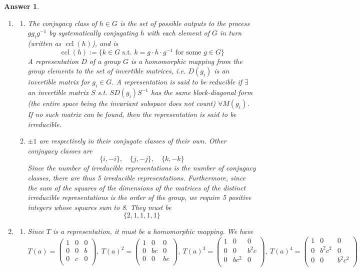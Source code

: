 \documentclass[a4paper]{article}
\DeclareMathOperator{\ccl}{ccl}
\newtheorem{ans}{Answer}[section]
\theoremstyle{new}
\begin{document}
\begin{ans}\leavevmode
\begin{enumerate}[label=(\roman*)]
\item
\begin{enumerate}[label=(\alph*)]
\item The conjugacy class of $h\in G$ is the set of possible outputs to the process $gg_ig^{-1}$ by systematically conjugating $h$ with each element of $G$ in turn (written as $\ccl(h)$), and is
$$\ccl(h):=\{k\in G\text{ s.t. }k=g\cdot h\cdot g^{-1}\text{ for some }g\in G\}$$
A representation $D$ of a group $G$ is a homomorphic mapping from the group elements to the set of invertible matrices, i.e. $D(g_i)$ is an invertible matrix for $g_i\in G$. A representation is said to be reducible if $\exists$ an invertible matrix $S$ s.t. $SD(g_i)S^{-1}$ has the same block-diagonal form (the entire space being the invariant subspace does not count) $\forall M(g_i)$. If no such matrix can be found, then the representation is said to be irreducible.
\item $\pm1$ are respectively in their conjugate classes of their own. Other conjugacy classes are
$$\{i,-i\},\quad\{j,-j\},\quad\{k,-k\}$$
Since the number of irreducible representations is the number of conjugacy classes, there are thus 5 irreducible representations. Furthermore, since the sum of the squares of the dimensions of the matrices of the distinct irreducible representations is the order of the group, we require 5 positive integers whose squares sum to 8. They must be
$$\{2,1,1,1,1\}$$
\end{enumerate}
\item 
\begin{enumerate}[label=(\alph*)]
\item Since $T$ is a representation, it must be a homomorphic mapping. We have
$$T(a)=\begin{pmatrix}1&0&0\\0&0&b\\0&c&0\\\end{pmatrix},~ T(a)^2=\begin{pmatrix}1&0&0\\0&bc&0\\0&0&bc\\\end{pmatrix},~ T(a)^3=\begin{pmatrix}1&0&0\\0&0&b^2c\\0&bc^2&0\\\end{pmatrix},~ T(a)^4=\begin{pmatrix}1&0&0\\0&b^2c^2&0\\0&0&b^2c^2\\\end{pmatrix}$$

\end{enumerate}
\end{enumerate}
\end{ans}
\end{document}
